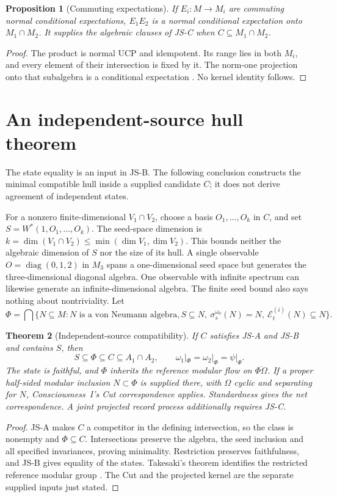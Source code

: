 \documentclass[12pt]{article}
\newtheorem{theorem}{Theorem}[section]
\newtheorem{proposition}[theorem]{Proposition}
\theoremstyle{definition}
\theoremstyle{remark}
\begin{document}
\begin{proposition}[Commuting expectations]\label{prop:commuting_square}
If \(E_i:M\to M_i\) are commuting normal conditional expectations,
\(E_1E_2\) is a normal conditional expectation onto \(M_1\cap M_2\).
It supplies the algebraic clauses of JS-C when \(C\subseteq M_1\cap M_2\).
\end{proposition}
\begin{proof}
The product is normal UCP and idempotent. Its range lies in both
\(M_i\), and every element of their intersection is fixed by it. The
norm-one projection onto that subalgebra is a conditional expectation
\cite{AccardiCecchini1982,Popa1983}. No kernel identity follows.
\end{proof}

\section{An independent-source hull theorem}\label{sec:two}

The state equality is an input in JS-B. The following conclusion
constructs the minimal compatible hull inside a supplied candidate
$C$; it does not derive agreement of independent states.

For a nonzero finite-dimensional \(V_1\cap V_2\), choose a basis
\(O_1,\ldots,O_k\) in \(C\), and set \(S=W^*(1,O_1,\ldots,O_k)\).
The seed-space dimension is \(k=\dim(V_1\cap V_2)\le
\min(\dim V_1,\dim V_2)\). This bounds neither the algebraic dimension
of \(S\) nor the size of its hull. A single observable
\(O=\operatorname{diag}(0,1,2)\) in \(M_3\) spans a one-dimensional
seed space but generates the three-dimensional diagonal algebra.
One observable with infinite spectrum can likewise generate an
infinite-dimensional algebra. The finite seed bound also says nothing
about nontriviality. Let
\[
 \Phi=\bigcap\{N\subseteq M:N\text{ is a von Neumann algebra},
 S\subseteq N,\ \sigma_s^{\omega_0}(N)=N,\ 
 \mathcal E_t^{(i)}(N)\subseteq N\}.
\]

\begin{theorem}[Independent-source compatibility]\label{thm:main}
If \(C\) satisfies JS-A and JS-B and contains \(S\), then
\[
 S\subseteq\Phi\subseteq C\subseteq A_1\cap A_2,
 \qquad \omega_1|_\Phi=\omega_2|_\Phi=\psi|_\Phi .
\]
The state is faithful, and \(\Phi\) inherits the reference modular
flow on \(\overline{\Phi\Omega}\). If a proper half-sided modular
inclusion \(N\subset\Phi\) is supplied there, with \(\Omega\) cyclic
and separating for \(N\), Consciousness~I's Cut correspondence applies.
Standardness gives the net correspondence. A joint projected record
process additionally requires JS-C.
\end{theorem}
\begin{proof}
JS-A makes \(C\) a competitor in the defining intersection, so the
class is nonempty and \(\Phi\subseteq C\). Intersections preserve the
algebra, the seed inclusion and all specified invariances, proving
minimality. Restriction preserves faithfulness, and JS-B gives equality
of the states. Takesaki's theorem identifies the restricted reference
modular group \cite{Takesaki1972,Hiai2021}. The Cut and the projected
kernel are the separate supplied inputs just stated.
\end{proof}
\end{document}
